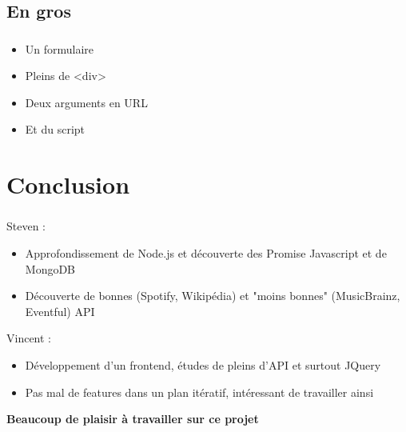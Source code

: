 \documentclass[10pt]{beamer}
\begin{document}
\subsection{En gros}
\begin{frame}
	\frametitle{\secname}
	\begin{itemize}
		\item Un formulaire
		\item Pleins de <div>
		\item Deux arguments en URL
		\item Et du script
	\end{itemize}
\end{frame}

\section{Conclusion}
\begin{frame}
	\frametitle{\secname}
	Steven :
	\begin{itemize}
		\item Approfondissement de Node.js et découverte des Promise Javascript et de MongoDB
		\item Découverte de bonnes (Spotify, Wikipédia) et "moins bonnes" (MusicBrainz, Eventful) API
	\end{itemize}
	Vincent :
	\begin{itemize}
		\item Développement d'un frontend, études de pleins d'API et surtout JQuery
		\item Pas mal de features dans un plan itératif, intéressant de travailler ainsi
	\end{itemize}
	\Large\textbf{Beaucoup de plaisir à travailler sur ce projet}
\end{frame}
\end{document}
